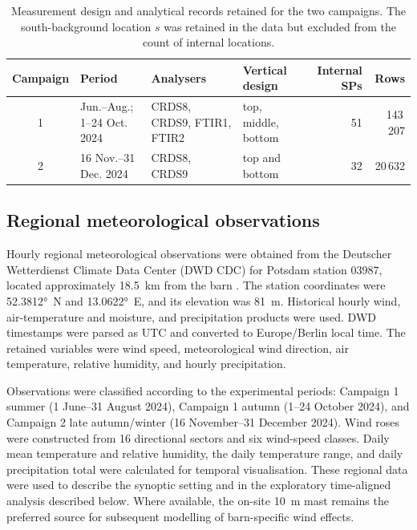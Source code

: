 \documentclass[12pt,a4paper]{article}
\begin{document}
\begin{table}[htbp]
\centering
\caption{Measurement design and analytical records retained for the two
campaigns. The south-background location \(s\) was retained in the data but
excluded from the count of internal locations.}
\label{tab:campaigns}
\begingroup
\small
\setlength{\tabcolsep}{1.5pt}
\begin{tabular}{@{}c l
  >{\raggedright\arraybackslash}p{4.0cm}
  >{\raggedright\arraybackslash}p{2.7cm}
  r r@{}}
\toprule
Campaign & Period & Analysers & Vertical design & Internal SPs & Rows\\
\midrule
1 & Jun.--Aug.; 1--24 Oct. 2024 & CRDS8, CRDS9, FTIR1, FTIR2 &
top, middle, bottom & 51 & 143\,207\\
2 & 16 Nov.--31 Dec. 2024 & CRDS8, CRDS9 &
top and bottom & 32 & 20\,632\\
\bottomrule
\end{tabular}
\endgroup
\end{table}

\subsection{Regional meteorological observations}

Hourly regional meteorological observations were obtained from the Deutscher
Wetterdienst Climate Data Center (DWD CDC) for Potsdam station 03987, located
approximately \SI{18.5}{km} from the barn \citep{DWD2024}. The station
coordinates were \ang{52.3812}~N and \ang{13.0622}~E, and its elevation was
\SI{81}{m}. Historical hourly
wind, air-temperature and moisture, and precipitation products were used.
DWD timestamps were parsed as UTC and converted to Europe/Berlin local time.
The retained variables were wind speed, meteorological wind direction, air
temperature, relative humidity, and hourly precipitation.

Observations were classified according to the experimental periods: Campaign
1 summer (1 June--31 August 2024), Campaign 1 autumn (1--24 October 2024), and
Campaign 2 late autumn/winter (16 November--31 December 2024). Wind roses were
constructed from 16 directional sectors and six wind-speed classes. Daily mean
temperature and relative humidity, the daily temperature range, and daily
precipitation total were calculated for temporal visualisation. These regional
data were used to describe the synoptic setting and in the exploratory
time-aligned analysis described below. Where available, the
on-site \SI{10}{m} mast remains the preferred source for subsequent modelling
of barn-specific wind effects.
\end{document}
